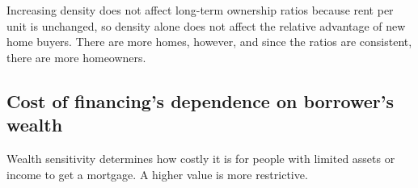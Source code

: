 Increasing density does not affect long-term ownership ratios because rent per unit is unchanged, so density alone does not affect the relative advantage of new home buyers. %
There are more homes, however, and since the ratios are consistent, there are more homeowners. %

\newpage

\subsection{Cost of financing's dependence on borrower's wealth}

Wealth sensitivity %
determines how costly it is for people with limited assets or income to get a mortgage. A higher value is more restrictive. %

